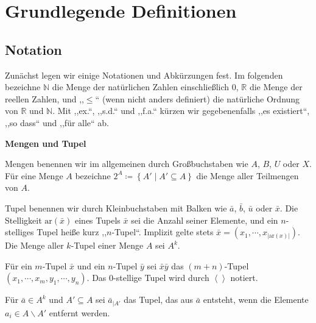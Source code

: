 
\chapter{Grundlegende Definitionen}

\section{Notation}

Zunächst legen wir einige Notationen und Abkürzungen fest. Im folgenden
bezeichne $\mathbb{N}$ die Menge der natürlichen Zahlen einschließlich
$0$, $\mathbb{R}$ die Menge der reellen Zahlen, und ,,$\leqslant$``
(wenn nicht anders definiert) die natürliche Ordnung von $\mathbb{R}$
und $\mathbb{N}$. Mit ,,ex.``, ,,s.d.`` und ,,f.a.`` kürzen
wir gegebenenfalls ,,es existiert``, ,,so dass`` und ,,für alle``
ab.
\begin{defn}
\textbf{\label{def:tupel}Mengen und Tupel}

Mengen benennen wir im allgemeinen durch Großbuchstaben wie $A$,
$B$, $U$ oder $X$. Für eine Menge $A$ bezeichne $2^{A}\coloneqq\left\{ A'\mid A'\subseteq A\right\} $
die Menge aller Teilmengen von $A$.

Tupel benennen wir durch Kleinbuchstaben mit Balken wie $\bar{a}$,
$\bar{b}$, $\bar{u}$ oder $\bar{x}$. Die Stelligkeit $\mathrm{ar}\left(\bar{x}\right)$
eines Tupels $\bar{x}$ sei die Anzahl seiner Elemente, und ein $n$-stelliges
Tupel heiße kurz ,,$n$-Tupel``. Implizit gelte stets $\bar{x}=\left(x_{1},\cdots,x_{\left|\mathrm{ar}\left(x\right)\right|}\right)$.
Die Menge aller $k$-Tupel einer Menge $A$ sei $A^{k}$.

Für ein $m$-Tupel $\bar{x}$ und ein $n$-Tupel $\bar{y}$ sei $\bar{x}\bar{y}$
das $\left(m+n\right)$-Tupel $\left(x_{1},\cdots,x_{m},y_{1},\cdots,y_{n}\right)$.
Das $0$-stellige Tupel wird durch $\left\langle \right\rangle $
notiert.

Für $\bar{a}\in A^{k}$ und $A'\subseteq A$ sei $\bar{a}_{\mid A'}$
das Tupel, das aus $\bar{a}$ entsteht, wenn die Elemente $a_{i}\in A\backslash A'$
entfernt werden.
\end{defn}

